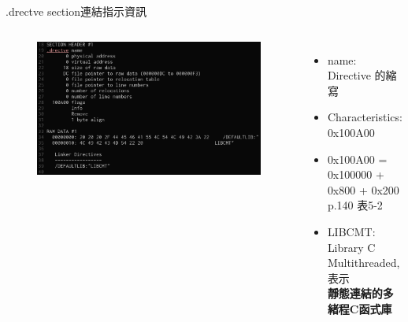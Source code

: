 \begin{frame}{.drectve section}{連結指示資訊}
    \begin{columns}[t]
        \begin{figure}
            \begin{center}
                \includegraphics[width=\textwidth]{./image/directivesec.png}
            \end{center}
        \end{figure}
        \begin{itemize}
            \item name: Directive 的縮寫
            \item Characteristics: 0x100A00
            \item 0x100A00 = 0x100000 + 0x800 + 0x200 \\
                  p.140 表5-2
            \item LIBCMT: Library C Multithreaded, 表示\\\textbf{靜態連結的多緒程C函式庫}
        \end{itemize}
    \end{columns}
\end{frame}

